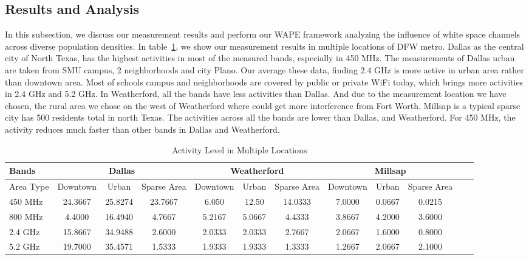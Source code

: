 \subsection{Results and Analysis} 
\label{subsec:result}
In this subsection, we discuss our measurement results and perform our WAPE framework analyzing the 
influence of white space channels across diverse population densities.
In table~\ref{tab:activitymeasurement}, we show our measurement results in multiple locations of DFW metro.
Dallas as the central city of North Texas, has the highest activities in most of the measured bands,
 especially in 450 MHz. The measurements of Dallas urban are taken from SMU campus, 2 neighborhoods
 and city Plano. Our average these data, finding 2.4 GHz is more active in urban area rather than 
 downtown area. Most of schools campus and neighborhoods are covered by public or private WiFi today,
which brings more activities in 2.4 GHz and 5.2 GHz.
In Weatherford, all the bands have less activities than Dallas. And due to the measurement location
we have chosen, the rural area we chose on the west of Weatherford where could get more interference from
Fort Worth.
Millsap is a typical sparse city has 500 residents total in north Texas. The activities across all the bands are lower than
Dallas, and Weatherford. For 450 MHz, the activity reduces much faster than other bands in Dallas
and Weatherford. 

\begin{table}
\centering %
\begin{tabular}{|l|c|c|c|c|c|c|c|c|c|c|c|} %
\hline %
Bands     & \multicolumn{3}{c|}{Dallas} & \multicolumn{3}{c|}{Weatherford} & \multicolumn{3}{c|}{Millsap} \\%
\hline %
Area Type & Downtown & Urban & Sparse Area & Downtown &  Urban   & Sparse Area & Downtown & Urban & Sparse Area \\ %
\hline %
450 MHz &24.3667	&25.8274  &23.7667	&6.050 &12.50  &14.0333 & 7.0000 & 0.0667 & 0.0215 \\      
\hline %
800 MHz &4.4000 	&16.4940  &4.7667	&5.2167&5.0667 &4.4333  & 3.8667 & 4.2000 & 3.6000 \\      
\hline %
2.4 GHz &15.8667 	&34.9488  &2.6000	&2.0333&2.0333 &2.7667  & 2.0667 & 1.6000 & 0.8000 \\      
\hline %
5.2 GHz &19.7000	&35.4571  &1.5333	&1.9333&1.9333 &1.3333  & 1.2667 & 2.0667 & 2.1000 \\      
\hline %
\end{tabular}    
\label{tab:activitymeasurement}    
\caption{Activity Level in Multiple Locations} %
\end{table}    

